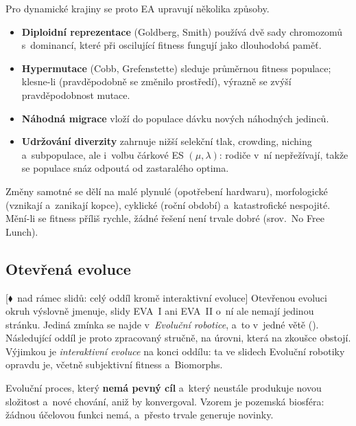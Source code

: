 \documentclass[11pt,a4paper]{article}
\theoremstyle{definition}
\newcommand{\mimoq}[1]{\textcolor{markcol}{\textsf{\footnotesize[$\blacklozenge$~nad rámec slidů: #1]}}}
\begin{document}
Pro dynamické krajiny se proto EA upravují několika způsoby.

\begin{itemize}
\item \textbf{Diploidní reprezentace} (Goldberg, Smith) používá dvě sady chromozomů
  s~dominancí, které při oscilující fitness fungují jako dlouhodobá paměť.
\item \textbf{Hypermutace} (Cobb, Grefenstette) sleduje průměrnou fitness populace; klesne-li
  (pravděpodobně se změnilo prostředí), výrazně se zvýší pravděpodobnost mutace.
\item \textbf{Náhodná migrace} vloží do populace dávku nových náhodných jedinců.
\item \textbf{Udržování diverzity} zahrnuje nižší selekční tlak, crowding, niching
  a~subpopulace, ale i~volbu čárkové ES $(\mu,\lambda)$: rodiče v~ní nepřežívají, takže se
  populace snáz odpoutá od zastaralého optima.
\end{itemize}
Změny samotné se dělí na malé plynulé (opotřebení hardwaru), morfologické (vznikají
a~zanikají kopce), cyklické (roční období) a~katastrofické nespojité. Mění-li se fitness
příliš rychle, žádné řešení není trvale dobré (srov.\ No Free Lunch).

\subsection{Otevřená evoluce}
\label{ssec:otevrena}

\noindent\mimoq{celý oddíl kromě interaktivní evoluce} Otevřenou evoluci okruh výslovně
jmenuje, slidy EVA~I ani EVA~II o~ní ale nemají jedinou stránku. Jediná zmínka se najde
v~\emph{Evoluční robotice}, a~to v~jedné větě (). Následující oddíl je proto zpracovaný stručně, na úrovni, která na
zkoušce obstojí. Výjimkou je \emph{interaktivní evoluce} na konci oddílu: ta ve slidech
Evoluční robotiky opravdu je, včetně subjektivní fitness a~Biomorphs.

\begin{defbox}
Evoluční proces, který \textbf{nemá pevný cíl} a~který neustále produkuje novou složitost
a~nové  chování, aniž by konvergoval. Vzorem je pozemská biosféra: žádnou účelovou
funkci nemá, a~přesto trvale generuje novinky.
\end{defbox}
\end{document}
